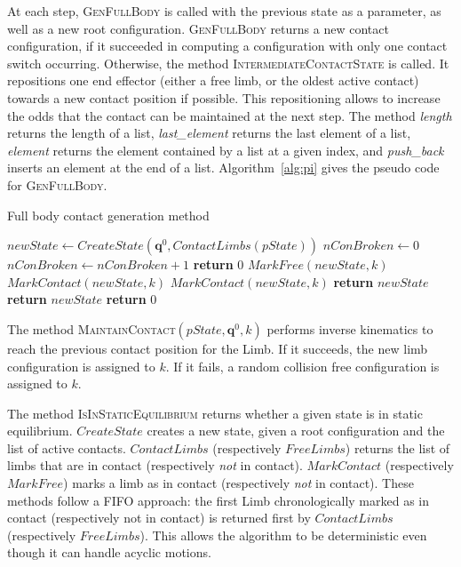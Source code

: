 At each step, \textsc{GenFullBody} is called with the previous state as a parameter, as well
as a new root configuration. \textsc{GenFullBody} returns a new contact configuration, if it succeeded
in computing a configuration with only one contact switch occurring.
Otherwise, the method \textsc{IntermediateContactState} is called.
It repositions one end effector (either a free limb, or the oldest active contact) towards a new contact position if possible.
This repositioning allows to increase the odds that the contact can be maintained at the next step.
The method \textit{length} returns the length of a list, \textit{last\_element} returns the last element
of a list, \textit{element} returns the element contained by a list at a given index, and \textit{push\_back} inserts an element at the end of a list.
Algorithm~\ref{alg:pi} gives the pseudo code for \textsc{GenFullBody}.

\begin{algorithm}[!tbp]
\caption{Full body contact generation method} \label{interpolate}
	\begin{algorithmic}[1]
		\State $newState \gets CreateState(\mathbf{q}^0, ContactLimbs(pState))$
		\State $nConBroken \gets 0$
				\State $nConBroken \gets nConBroken +1$
					\State \textbf{return} $0$
				\EndIf				
				\State $MarkFree(newState,k)$
			\Else 					
				\State $MarkContact(newState,k)$
			\EndIf
		\EndFor
				\State $MarkContact(newState,k)$
				\State \textbf{return} $newState$
			\EndIf
		\EndFor
			\State \textbf{return} $newState$
		\Else
			\State \textbf{return} $0$
		\EndIf
	\EndFunction
\end{algorithmic}
\label{alg:pi}
\end{algorithm}

The method \textsc{MaintainContact}$(pState,\mathbf{q}^0,k)$ performs inverse kinematics to reach the previous contact position for the Limb.
If it succeeds, the new limb configuration is assigned to $k$. If it fails, a random collision free configuration is assigned to $k$.

The method \textsc{IsInStaticEquilibrium} returns whether a given state is in static equilibrium. $CreateState$ creates a new state, given
a root configuration and the list of active contacts.
$ContactLimbs$ (respectively $FreeLimbs$) returns the list of limbs that are in contact (respectively \textit{not} in contact).  $MarkContact$ (respectively $MarkFree$)  marks a limb as in contact (respectively \textit{not} in contact). These methods follow a FIFO approach: the first Limb chronologically marked as in contact (respectively not in contact) is returned first by $ContactLimbs$ (respectively $FreeLimbs$). This allows the algorithm to be deterministic even though it can handle acyclic motions.

